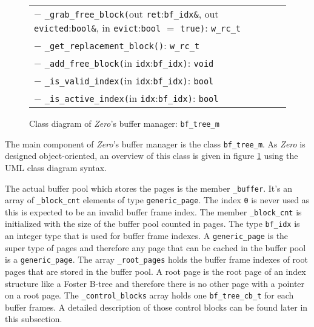 \begin{@empty}
\begin{figure}[ht!]
{\begin{tabularx}{\textwidth}{|X|}
			$-$ \texttt{\_grab\_free\_block(}out \texttt{ret}:\texttt{bf\_idx\&}, out \texttt{evicted}:\texttt{bool\&}, in \texttt{evict}:\texttt{bool} $=$ \texttt{true)}: \texttt{w\_rc\_t}								\\
			$-$ \texttt{\_get\_replacement\_block()}: \texttt{w\_rc\_t}																											\\
			$-$ \texttt{\_add\_free\_block(}in \texttt{idx}:\texttt{bf\_idx)}: \texttt{void}																								\\
			$-$ \texttt{\_is\_valid\_index(}in \texttt{idx}:\texttt{bf\_idx)}: \texttt{bool}																								\\
			$-$ \texttt{\_is\_active\_index(}in \texttt{idx}:\texttt{bf\_idx)}: \texttt{bool}																								\\	\hline
		\end{tabularx}}
        \vspace{.5em}
		\caption[Class diagram: Zero buffer manager]{Class diagram of \textit{Zero}'s buffer manager: \lstinline{bf_tree_m}}
		\label{fig:bufferdesign}
	\end{figure}
\end{@empty}

	The main component of \emph{Zero}'s buffer manager is the class \lstinline{bf_tree_m}. As \emph{Zero} is designed object-oriented, an overview of this class is given in figure \ref{fig:bufferdesign} using the UML class diagram syntax. 

	The actual buffer pool which stores the pages is the member \lstinline{_buffer}. It's an array of \lstinline{_block_cnt} elements of type \lstinline{generic_page}. The index \lstinline{0} is never used as this is expected to be an invalid buffer frame index. The member \lstinline{_block_cnt} is initialized with the size of the buffer pool counted in pages. The type \lstinline{bf_idx} is an integer type that is used for buffer frame indexes. A \lstinline{generic_page} is the super type of pages and therefore any page that can be cached in the buffer pool is a \lstinline{generic_page}. The array \lstinline{_root_pages} holds the buffer frame indexes of root pages that are stored in the buffer pool. A root page is the root page of an index structure like a Foster B-tree and therefore there is no other page with a pointer on a root page. The \lstinline{_control_blocks} array holds one \lstinline{bf_tree_cb_t} for each buffer frames. A detailed description of those control blocks can be found later in this subsection.

